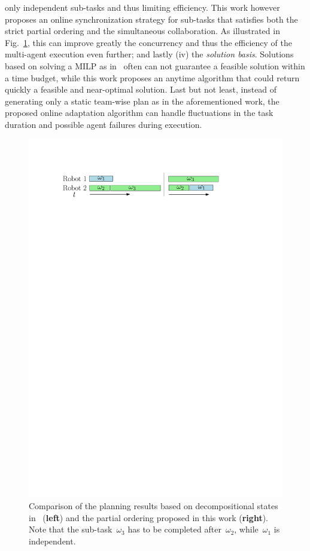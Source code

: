 only independent sub-tasks and thus limiting efficiency.
This work however proposes an online synchronization strategy for sub-tasks
that satisfies both the strict partial ordering and the simultaneous collaboration.
As illustrated in Fig.~\ref{fig:concurrent},
this can improve greatly the concurrency and thus the efficiency of the multi-agent execution even further;
and lastly
(iv) the \emph{solution basis}.
Solutions based on solving a MILP as in~\cite{luo2021temporal, sahin2019multirobot, jones2019scratchs} often can not guarantee a feasible solution within a time budget,
while this work proposes an anytime algorithm that could return quickly a feasible
and near-optimal solution.
Last but not least,
instead of generating only a static team-wise plan as in the aforementioned work,
the proposed online adaptation algorithm can handle fluctuations in the task duration
and possible agent failures during execution.

\begin{figure}[t!]
	\centering
	\includegraphics[width=0.95\linewidth]{figures/concurrent.pdf}
	\caption{Comparison of the planning results based on decompositional states
		in~\cite{schillinger2018simultaneous} (\textbf{left}) and the partial ordering proposed in this work (\textbf{right}).
		Note that the sub-task~$\omega_3$ has to be {completed}
                after~$\omega_2$, while~$\omega_1$ is independent.}
		\label{fig:concurrent}
\end{figure}



